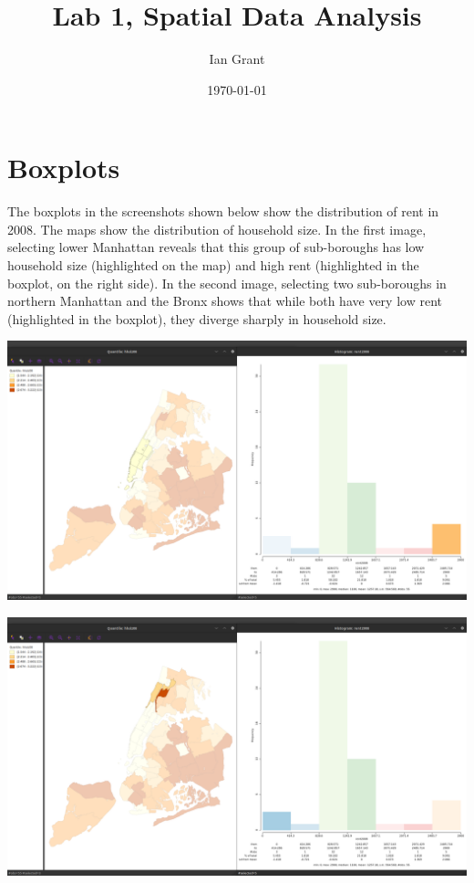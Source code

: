 \documentclass[11pt]{article}
\author{Ian Grant}
\date{\today}
\title{Lab 1, Spatial Data Analysis}
\begin{document}
\maketitle

\section{Boxplots}
\label{sec:org1e53fc9}
The boxplots in the screenshots shown below show the distribution of rent in 2008. The maps show the distribution of household size. In the first image, selecting lower Manhattan reveals that this group of sub-boroughs has low household size (highlighted on the map) and high rent (highlighted in the boxplot, on the right side). In the second image, selecting two sub-boroughs in northern Manhattan and the Bronx shows that while both have very low rent (highlighted in the boxplot), they diverge sharply in household size.

\begin{center}
\includegraphics[width=.9\linewidth]{hist_hhsize_high.png}
\end{center}
\begin{center}
\includegraphics[width=.9\linewidth]{hist_hhsize_low.png}
\end{center}
\end{document}
